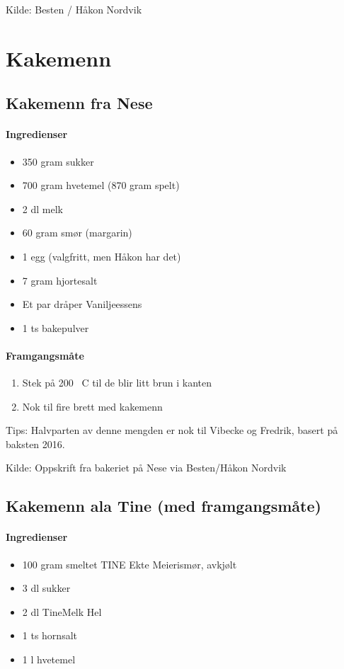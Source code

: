 \documentclass[12pt,a4paper]{book}
\begin{document}
Kilde: Besten / Håkon Nordvik
\clearpage{}
\clearpage{}\section{﻿Kakemenn}

\subsection{Kakemenn fra Nese}

\paragraph{Ingredienser}
\begin{itemize}[noitemsep]
	\item 350 gram sukker
	\item 700 gram hvetemel (870 gram spelt)
	\item 2 dl melk
	\item 60 gram smør (margarin)
	\item 1 egg (valgfritt, men Håkon har det)
	\item 7 gram hjortesalt
	\item Et par dråper Vaniljeessens
	\item 1 ts bakepulver
\end{itemize}

\paragraph{Framgangsmåte}
\begin{enumerate}[noitemsep]
	\item Stek på 200 \degree~C til de blir litt brun i kanten
	\item Nok til fire brett med kakemenn
\end{enumerate}

Tips: Halvparten av denne mengden er nok til Vibecke og Fredrik, basert på baksten 2016.

Kilde: Oppskrift fra bakeriet på Nese via Besten/Håkon Nordvik


\subsection{Kakemenn ala Tine (med framgangsmåte)}

\paragraph{Ingredienser}
\begin{itemize}[noitemsep]
	\item 100 gram smeltet TINE Ekte Meierismør, avkjølt
	\item 3 dl sukker
	\item 2 dl TineMelk Hel
	\item 1 ts hornsalt
	\item 1 l hvetemel
\end{itemize}
\end{document}
